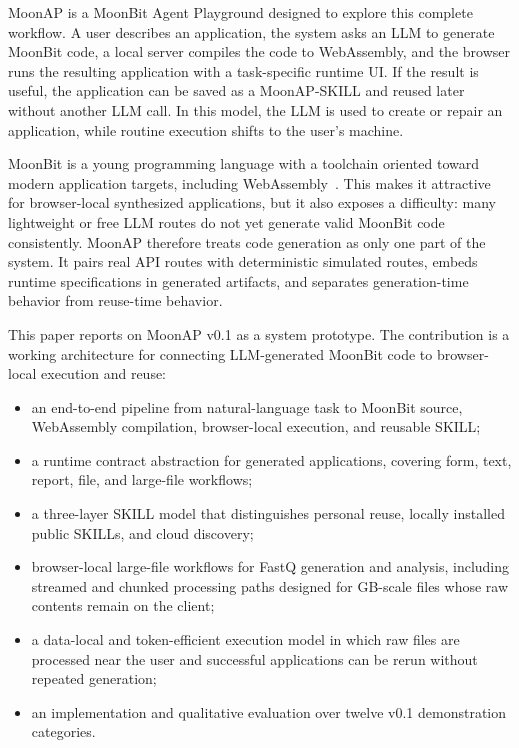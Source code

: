 \documentclass[11pt]{article}
\newcommand{\moonap}{MoonAP}
\newcommand{\skill}{SKILL}
\newcommand{\wasm}{WebAssembly}
\begin{document}
\moonap{} is a MoonBit Agent Playground designed to explore this complete workflow. A user describes an application, the system asks an LLM to generate MoonBit code, a local server compiles the code to \wasm{}, and the browser runs the resulting application with a task-specific runtime UI. If the result is useful, the application can be saved as a \moonap{}-\skill{} and reused later without another LLM call. In this model, the LLM is used to create or repair an application, while routine execution shifts to the user's machine.

MoonBit is a young programming language with a toolchain oriented toward modern application targets, including \wasm{}~\cite{moonbit,webassembly}. This makes it attractive for browser-local synthesized applications, but it also exposes a difficulty: many lightweight or free LLM routes do not yet generate valid MoonBit code consistently. \moonap{} therefore treats code generation as only one part of the system. It pairs real API routes with deterministic simulated routes, embeds runtime specifications in generated artifacts, and separates generation-time behavior from reuse-time behavior.

This paper reports on \moonap{} v0.1 as a system prototype. The contribution is a working architecture for connecting LLM-generated MoonBit code to browser-local execution and reuse:

\begin{itemize}[leftmargin=*]
  \item an end-to-end pipeline from natural-language task to MoonBit source, \wasm{} compilation, browser-local execution, and reusable \skill{};
  \item a runtime contract abstraction for generated applications, covering form, text, report, file, and large-file workflows;
  \item a three-layer \skill{} model that distinguishes personal reuse, locally installed public \skill{}s, and cloud discovery;
  \item browser-local large-file workflows for FastQ generation and analysis, including streamed and chunked processing paths designed for GB-scale files whose raw contents remain on the client;
  \item a data-local and token-efficient execution model in which raw files are processed near the user and successful applications can be rerun without repeated generation;
  \item an implementation and qualitative evaluation over twelve v0.1 demonstration categories.
\end{itemize}
\end{document}

